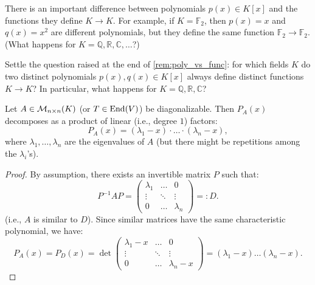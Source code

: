 \begin{importantremark}\label{rem:poly_vs_func}
  There is an important difference between polynomials $p(x) \in K[x]$ and the functions they define $K \rightarrow K$.
  For example, if $K = \mathbb{F}_2$, then $p(x) = x$ and $q(x) = x^2$ are different polynomials, but they define the same function $\mathbb{F}_2 \rightarrow \mathbb{F}_2$. (What happens for $K = \mathbb{Q}, \mathbb{R}, \mathbb{C}, \dots$?)
\end{importantremark}

\begin{exercise}\label{ex:poly_vs_func}
  Settle the question raised at the end of \cref{rem:poly_vs_func}: for which fields $K$ do two distinct polynomials $p(x), q(x) \in K[x]$ always define distinct functions $K \to K$? In particular, what happens for $K = \mathbb{Q}, \mathbb{R}, \mathbb{C}$?
\end{exercise}

\begin{lemma}
  \label{lem:diag_decomp}
  Let $A \in \mathcal{M}_{n \times n}(K)$ (or $T \in \operatorname{End}(V)$) be diagonalizable. Then $P_A(x)$ decomposes as a product of linear (i.e., degree $1$) factors:
  \[ P_A(x) = (\lambda_1 - x) \cdot \dots \cdot (\lambda_n - x), \]
  where $\lambda_1, \dots, \lambda_n$ are the eigenvalues of $A$ (but there might be repetitions among the $\lambda_i$'s).
\end{lemma}

\begin{proof}
  By assumption, there exists an invertible matrix $P$ such that:
  \begin{equation} \label{eq:diagonal_similarity}
    P^{-1}AP = \begin{pmatrix} \lambda_1 & \dots & 0 \\ \vdots & \ddots & \vdots \\ 0 & \dots & \lambda_n \end{pmatrix} =: D.
  \end{equation}
  (i.e., $A$ is similar to $D$).
  Since similar matrices have the same characteristic polynomial, we have:
  \[ P_A(x) = P_D(x) = \det \begin{pmatrix} \lambda_1 - x & \dots & 0 \\ \vdots & \ddots & \vdots \\ 0 & \dots & \lambda_n - x \end{pmatrix} = (\lambda_1 - x) \dots (\lambda_n - x). \]
\end{proof}

